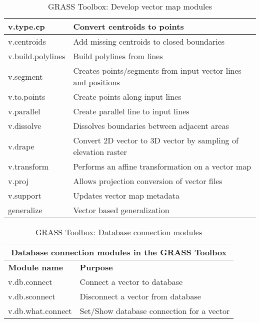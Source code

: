 {\begin{table}[H]
\begin{tabular}{|p{3cm}|p{11cm}|}
  \hline v.type.cp & Convert centroids to points \\
  \hline v.centroids & Add missing centroids to closed boundaries  \\
  \hline v.build.polylines & Build polylines from lines \\
  \hline v.segment & Creates points/segments from input vector lines and
  positions \\
  \hline v.to.points & Create points along input lines \\
  \hline v.parallel & Create parallel line to input lines \\
  \hline v.dissolve & Dissolves boundaries between adjacent areas \\
  \hline v.drape & Convert 2D vector to 3D vector by sampling of elevation
  raster\\
  \hline v.transform & Performs an affine transformation on a vector map \\
  \hline v.proj & Allows projection conversion of vector files \\
  \hline v.support & Updates vector map metadata \\
  \hline generalize & Vector based generalization \\
\hline
\end{tabular}
\caption{GRASS Toolbox: Develop vector map modules}
\end{table}}

\begin{table}[H]
\centering
 \begin{tabular}{|p{4cm}|p{10cm}|}
  \hline \multicolumn{2}{|c|}{\textbf{Database connection modules in the GRASS
  Toolbox}} \\
  \hline \textbf{Module name} & \textbf{Purpose} \\
  \hline v.db.connect & Connect a vector to database \\
  \hline v.db.sconnect & Disconnect a vector from database \\
  \hline v.db.what.connect & Set/Show database connection for a vector \\
\hline
\end{tabular}
\caption{GRASS Toolbox: Database connection modules}
\end{table}

